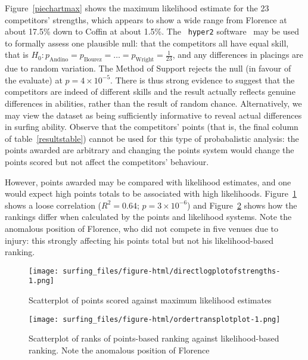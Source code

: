 \documentclass{article}
\begin{document}
Figure~\ref{piechartmax} shows the maximum likelihood estimate for the
23 competitors' strengths, which appears to show a wide range from
Florence at about 17.5\% down to Coffin at about 1.5\%.  The {\tt
  hyper2} software~\cite{hankin2017} may be used to formally assess
one plausible null: that the competitors all have equal skill, that is
$H_0\colon p_\mathrm{Andino} = p_\mathrm{Bourez}=\ldots=
p_\mathrm{Wright}=\frac{1}{23}$, and any differences in placings are
due to random variation.  The Method of Support \cite{edwards1992}
rejects the null (in favour of the evaluate) at $p=4\times 10^{-5}$.
There is thus strong evidence to suggest that the competitors are
indeed of different skills and the result actually reflects genuine
differences in abilities, rather than the result of random chance.
Alternatively, we may view the dataset as being sufficiently
informative to reveal actual differences in surfing ability.  Observe
that the competitors' points (that is, the final column of
table~\ref{resultstable}) cannot be used for this type of
probabalistic analysis: the points awarded are arbitrary and changing
the points system would change the points scored but not affect the
competitors' behaviour.

However, points awarded may be compared with likelihood estimates, and
one would expect high points totals to be associated with high
likelihoods.  Figure~\ref{compare_likelihood_points} shows a loose
correlation ($R^2=0.64$; $p=3\times 10^{-6}$) and
Figure~\ref{compare_likelihood_points_rankings} shows how the rankings
differ when calculated by the points and likelihood systems.  Note the
anomalous position of Florence, who did not compete in five venues due
to injury: this strongly affecting his points total but not his
likelihood-based ranking.

\begin{figure}[h]
\texttt{[image: surfing\_files/figure-html/directlogplotofstrengths-1.png]}
\caption{Scatterplot of points scored  \label{compare_likelihood_points} 
against maximum likelihood estimates}
\end{figure}

\begin{figure}[h]
\texttt{[image: surfing\_files/figure-html/ordertransplotplot-1.png]}
\caption{Scatterplot of ranks \label{compare_likelihood_points_rankings} of points-based ranking
against likelihood-based ranking.  Note the anomalous position of
Florence}
\end{figure}
\end{document}
